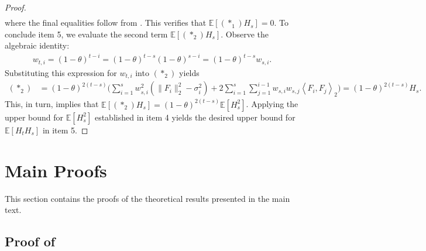 \documentclass[a4paper, 11pt]{article}
\newcommand{\E}{\mathbb E}
\theoremstyle{definition}
\begin{document}
\begin{proof}
\begin{align}
	\end{align}
	where the final equalities follow from .
	This verifies that $\E[ (*_1) H_s] = 0$.
	To conclude item 5, we evaluate the second term $\E[ (*_2) H_s]$.
	Observe the algebraic identity:
	\begin{align}
		w_{t,i} = (1 - \theta)^{t-i} = (1 - \theta)^{t-s} (1 - \theta)^{s-i} = (1 - \theta)^{t-s} w_{s,i} .
	\end{align}
    Substituting this expression for $w_{t,i}$ into $(*_2)$ yields
	\begin{align}
		(*_2) & = (1 - \theta)^{2(t-s)} \bigg( \sum_{i=1}^{s}{ w_{s,i}^2} \left( \| F_i \|_2^2 - \sigma_i^2 \right) + 2 \sum_{i = 1}^{s} \sum_{j = 1}^{i-1}{w_{s,i} w_{s,j}} \left\langle F_i, F_j \right\rangle_2 \bigg) = (1 - \theta)^{2(t-s)} H_s .
	\end{align}
    This, in turn, implies that $\E[ (*_2) H_s] = (1 - \theta)^{2(t-s)} \E[ H_s^2 ]$.
    Applying the upper bound for $\E[ H_s^2 ]$ established in item 4 yields the desired upper bound for $\E[ H_t H_s]$ in item 5.
\end{proof}



\section{Main Proofs} \label{apx:proofs}

This section contains the proofs of the theoretical results presented in the main text.

\subsection{Proof of } \label{apx:proof_quantile_process}
\end{document}
